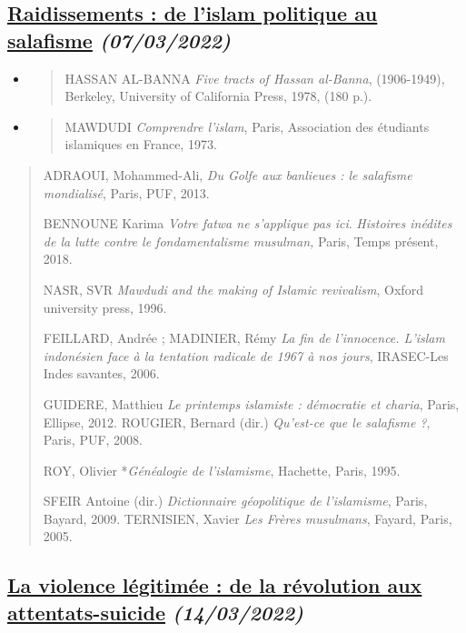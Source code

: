 \hypertarget{raidissements-de-lislam-politique-au-salafisme-07032022}{%
\subsection{\texorpdfstring{\underline{Raidissements : de l'islam
politique au salafisme}
\emph{(07/03/2022)}}{Raidissements : de l'islam politique au salafisme (07/03/2022)}}\label{raidissements-de-lislam-politique-au-salafisme-07032022}}

\begin{itemize}
\item
  \begin{quote}
  HASSAN AL-BANNA \emph{Five tracts of Hassan al-Banna}, (1906-1949),
  Berkeley, University of California Press, 1978, (180 p.).
  \end{quote}
\item
  \begin{quote}
  MAWDUDI \emph{Comprendre l'islam}, Paris, Association des étudiants
  islamiques en France, 1973.
  \end{quote}
\end{itemize}

\begin{quote}
ADRAOUI, Mohammed-Ali, \emph{Du Golfe aux banlieues : le salafisme
mondialisé}, Paris, PUF, 2013.

BENNOUNE Karima \emph{Votre fatwa ne s'applique pas ici}.
\emph{Histoires inédites de la lutte contre le fondamentalisme
musulman,} Paris, Temps présent, 2018.

NASR, SVR \emph{Mawdudi and the making of Islamic revivalism}, Oxford
university press, 1996.

FEILLARD, Andrée ; MADINIER, Rémy \emph{La fin de l'innocence. L'islam
indonésien face à la tentation radicale de 1967 à nos jours}, IRASEC-Les
Indes savantes, 2006.

GUIDERE, Matthieu \emph{Le printemps islamiste : démocratie et charia},
Paris, Ellipse, 2012. ROUGIER, Bernard (dir.) \emph{Qu'est-ce que le
salafisme ?}, Paris, PUF, 2008.

ROY, Olivier *\emph{Généalogie de l'islamisme}, Hachette, Paris, 1995.

SFEIR Antoine (dir.) \emph{Dictionnaire géopolitique de l'islamisme},
Paris, Bayard, 2009. TERNISIEN, Xavier \emph{Les Frères musulmans},
Fayard, Paris, 2005.
\end{quote}

\hypertarget{la-violence-luxe9gitimuxe9e-de-la-ruxe9volution-aux-attentats-suicide-14032022}{%
\subsection{\texorpdfstring{\underline{La violence légitimée : de la
révolution aux attentats-suicide}
\emph{(14/03/2022)}}{La violence légitimée : de la révolution aux attentats-suicide (14/03/2022)}}\label{la-violence-luxe9gitimuxe9e-de-la-ruxe9volution-aux-attentats-suicide-14032022}}

